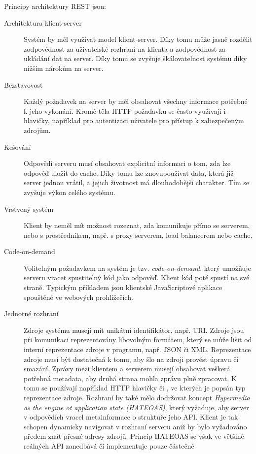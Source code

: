 Principy architektury \gls{REST} jsou:

\begin{description}
    \item [Architektura klient-server] Systém by měl využívat model klient-server. Díky tomu může jasně rozdělit
    zodpovědnost za uživatelské rozhraní na klienta a zodpovědnost za ukládání dat na server. Díky tomu se zvyšuje
    škálovatelnost systému díky nižším nárokům na server.
    \item [Bezstavovost] Každý požadavek na server by měl obsahovat všechny informace potřebné k jeho vykonání.
    Kromě těla \gls{HTTP} požadavku se často využívají i hlavičky, například pro autentizaci uživatele pro
    přístup k zabezpečeným zdrojům.
    \item [Kešování] Odpovědi serveru musí obsahovat explicitní informaci o tom, zda lze odpověď uložit do cache.
    Díky tomu lze znovupoužívat data, která již server jednou vrátil, a jejich životnost má dlouhodobější charakter.
    Tím se zvyšuje výkon celého systému.
    \item [Vrstvený systém] Klient by neměl mít možnost rozeznat, zda komunikuje přímo se serverem, nebo s prostředníkem,
    např. s proxy serverem, load balancerem nebo cache.
    \item [Code-on-demand] Volitelným požadavkem na systém je tzv. \textit{code-on-demand}, který umožňuje serveru vracet
    spustitelný kód jako odpověď. Klient kód poté spustí na své straně. Typickým příkladem jsou klientské JavaScriptové aplikace spouštěné ve webových prohlížečích.
    \item [Jednotné rozhraní] Zdroje systému musejí mít unikátní identifikátor, např. \gls{URI}. Zdroje jsou při komunikaci reprezentovány libovolným formátem, který
    se může lišit od interní reprezentace zdroje v programu, např. \gls{JSON} či \gls{XML}. Reprezentace zdroje musí být
    dostatečná k tomu, aby šlo na zdroji provést úpravu či smazání. Zprávy mezi klientem a serverem musejí obsahovat veškerá potřebná metadata,
    aby druhá strana mohla zprávu plně zpracovat. K tomu se používají například \gls{HTTP} hlavičky 
    či , ve kterých je popsán typ reprezentace zdroje.
    Rozhraní by také mělo dodržovat koncept \textit{Hypermedia as the engine ot application state (\gls{HATEOAS})},
    který vyžaduje, aby server v odpovědích vracel metainformace o struktuře jeho \gls{API}.
    Klient je tak schopen dynamicky navigovat v rozhraní serveru aniž by bylo vyžadováno předem znát přesné adresy zdrojů.
    Princip \gls{HATEOAS} se však ve většině reálných \gls{API} zanedbává či implementuje pouze částečně
\end{description}

